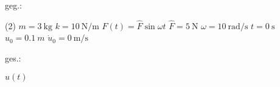 \vspace{1em}

    

    \begin{minipage}[t]{.49\linewidth}
    geg.:
    \begin{tasks}(2)
        \task[] $m = \SI{3}{\kilo\gram}$
        \task[] $k = \SI{10}{\newton\per\meter}$
        \task[] $F(t) = \hat{F} \sin{\omega t}$
        \task[] $\hat{F} = \SI{5}{\newton}$
        \task[] $\omega = \SI{10}{\radian\per\second}$
        \task[] $t=\SI{0}{\second}$
        \task[] $u_0 = \SI{0.1}{m}$
        \task[] $\dot{u}_0 = \SI{0}{\meter\per\second}$
    \end{tasks}
    \end{minipage}
    \begin{minipage}[t]{.49\linewidth}
    ges.:
    \begin{tasks}
        \task $u(t)$
    \end{tasks}
    \end{minipage}

